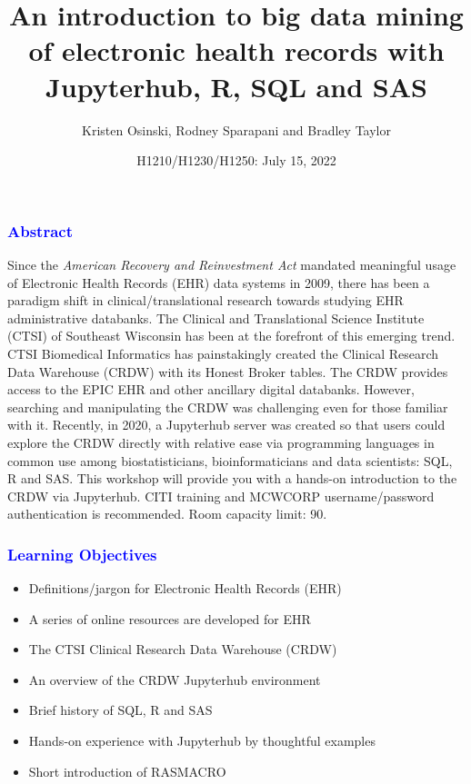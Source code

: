 \documentclass[11pt,pdftex,dvipsnames,usenames]{beamer}
\title{An introduction to big data mining of electronic health records with
Jupyterhub, R, SQL and SAS}
\author{Kristen Osinski, Rodney Sparapani and Bradley Taylor}
\date{H1210/H1230/H1250: July 15, 2022}
\begin{document}


\titlepage
\boldmath

\begin{frame}[fragile]\frametitle{\bf\textcolor{blue}{Abstract}}
  Since the \emph{American Recovery and Reinvestment Act} mandated
  meaningful usage of Electronic Health Records (EHR) data systems in
  2009, there has been a paradigm shift in clinical/translational
  research towards studying EHR administrative databanks.  The
  Clinical and Translational Science Institute (CTSI) of Southeast
  Wisconsin has been at the forefront of this emerging trend.  CTSI
  Biomedical Informatics has painstakingly created the Clinical
  Research Data Warehouse (CRDW) with its Honest Broker tables.  The
  CRDW provides access to the EPIC EHR and other ancillary digital
  databanks. However, searching and manipulating the CRDW was
  challenging even for those familiar with it.  Recently, in 2020, a
  Jupyterhub server was created so that users could explore the CRDW
  directly with relative ease via programming languages in common use
  among biostatisticians, bioinformaticians and data scientists: SQL,
  R and SAS.  This workshop will provide you with a hands-on
  introduction to the CRDW via Jupyterhub.  CITI training and MCWCORP
  username/password authentication is recommended.  Room capacity
  limit: 90.
\end{frame}
 
\begin{frame}[fragile]\frametitle{\bf\textcolor{blue}{Learning
      Objectives}}
\begin{itemize}
\item Definitions/jargon for Electronic Health Records (EHR)
\item A series of online resources are developed for EHR
\item The CTSI Clinical Research Data Warehouse (CRDW)
\item An overview of the CRDW Jupyterhub environment 
\item Brief history of SQL, R and SAS
\item Hands-on experience with Jupyterhub by thoughtful examples
\item Short introduction of RASMACRO 
\end{itemize}
\end{frame}
\end{document}
